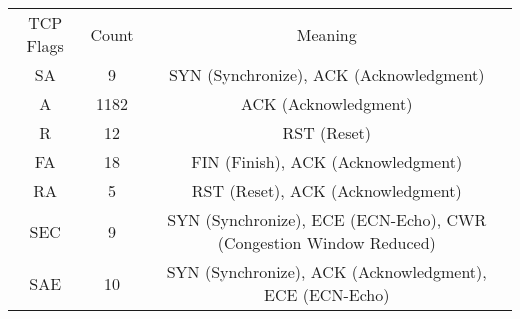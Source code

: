 \begin{tabular}{ccc}
TCP Flags & Count & Meaning \\
SA & 9 & SYN (Synchronize), ACK (Acknowledgment) \\
A & 1182 & ACK (Acknowledgment) \\
R & 12 & RST (Reset) \\
FA & 18 & FIN (Finish), ACK (Acknowledgment) \\
RA & 5 & RST (Reset), ACK (Acknowledgment) \\
SEC & 9 & SYN (Synchronize), ECE (ECN-Echo), CWR (Congestion Window Reduced) \\
SAE & 10 & SYN (Synchronize), ACK (Acknowledgment), ECE (ECN-Echo) \\
\end{tabular}
